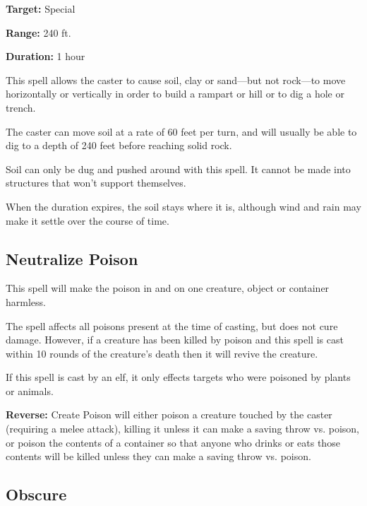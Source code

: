 \begin{multicols*}{2}
{\textbf{Target:} Special

\textbf{Range:} 240 ft.

\textbf{Duration:} 1 hour}

This spell allows the caster to cause soil, clay or sand—but not rock—to move horizontally or vertically in order to build a rampart or hill or to dig a hole or trench.

The caster can move soil at a rate of 60 feet per turn, and will usually be able to dig to a depth of 240 feet before reaching solid rock.

Soil can only be dug and pushed around with this spell. It cannot be made into structures that won’t support themselves.

When the duration expires, the soil stays where it is, although wind and rain may make it settle over the course of time.

\subsection{Neutralize Poison}\label{spell:Neutralize Poison}

This spell will make the poison in and on one creature, object or container harmless.

The spell affects all poisons present at the time of casting, but does not cure damage. However, if a creature has been killed by poison and this spell is cast within 10 rounds of the creature’s death then it will revive the creature.

If this spell is cast by an elf, it only effects targets who were poisoned by plants or animals.

\textbf{Reverse:} \hypertarget{spell:Create Poison}{Create Poison} will either poison a creature touched by the caster (requiring a melee attack), killing it unless it can make a saving throw vs. poison, or poison the contents of a container so that anyone who drinks or eats those contents will be killed unless they can make a saving throw vs. poison.

\subsection{Obscure}\label{spell:Obscure}
\end{multicols*}
